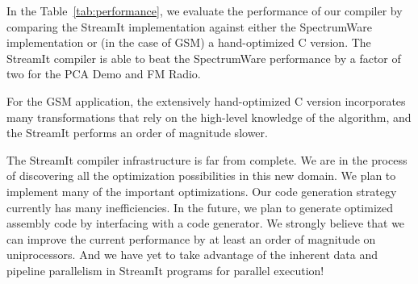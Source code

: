 



In the Table~\ref{tab:performance}, we evaluate the performance of our
compiler by comparing the StreamIt implementation against either the
SpectrumWare implementation or (in the case of GSM) a hand-optimized C
version.  The StreamIt compiler is able to beat the SpectrumWare
performance by a factor of two for the PCA Demo and FM Radio.

For the GSM application, the extensively hand-optimized C version
incorporates many transformations that rely on the high-level
knowledge of the algorithm, and the StreamIt performs an order of
magnitude slower.

The StreamIt compiler infrastructure is far from complete. We are in
the process of discovering all the optimization possibilities in this
new domain.  We plan to implement many of the important optimizations.
Our code generation strategy currently has many inefficiencies. In the
future, we plan to generate optimized assembly code by interfacing
with a code generator.  We strongly believe that we can improve the
current performance by at least an order of magnitude on
uniprocessors. And we have yet to take advantage of the inherent data
and pipeline parallelism in StreamIt programs for parallel execution!

